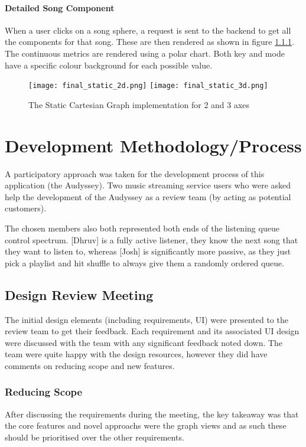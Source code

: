 \paragraph{Detailed Song Component}
When a user clicks on a song sphere, a request is sent to the backend to get all the components for that song. These are then rendered as shown in figure \ref{}. The continuous metrics are rendered using a polar chart. Both key and mode have a specific colour background for each possible value.

\begin{figure}[h]
    \texttt{[image: final\_static\_2d.png]}
    \texttt{[image: final\_static\_3d.png]}
    \caption{The Static Cartesian Graph implementation for 2 and 3 axes}
\end{figure}

\section{Development Methodology/Process}
A participatory approach was taken for the development process of this application (the Audyssey). Two music streaming service users who were asked help the development of the Audyssey as a review team (by acting as potential customers).

The chosen members also both represented both ends of the listening queue control spectrum. [Dhruv] is a fully active listener, they know the next song that they want to listen to, whereas [Josh] is significantly more passive, as they just pick a playlist and hit shuffle to always give them a randomly ordered queue.

\subsection{Design Review Meeting}
The initial design elements (including requirements, UI) were presented to the review team to get their feedback. Each requirement and its associated UI design were discussed with the team with any significant feedback noted down. The team were quite happy with the design resources, however they did have comments on reducing scope and new features.

\subsubsection{Reducing Scope}%
After discussing the requirements during the meeting, the key takeaway was that the core features and novel approachs were the graph views and as such these should be prioritised over the other requirements.

